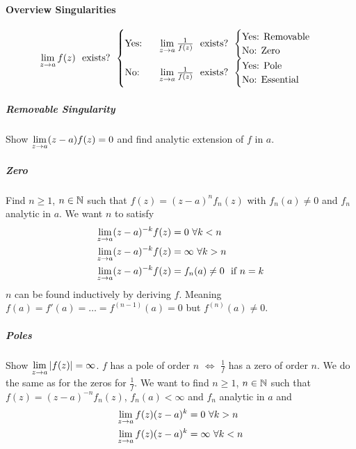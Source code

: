 \paragraph{Overview Singularities}
\begin{align*}
    \limes{z \rightarrow a} f(z) \ \text{ exists? } \begin{cases}
        \text{Yes: } \ &\limes{z \rightarrow a} \frac{1}{f(z)} \ \text{ exists? }
        \begin{cases}
            \text{Yes: Removable}
            \\
            \text{No: Zero}
        \end{cases}
        \\
        \text{No: } \ &\limes{z \rightarrow a} \frac{1}{f(z)} \ \text{ exists? }
        \begin{cases}
            \text{Yes: Pole}
            \\
            \text{No: Essential}
        \end{cases}
    \end{cases}
\end{align*}

\subparagraph{Removable Singularity}
Show $\lim\limits_{z \rightarrow a} (z-a) f(z) = 0$ and find analytic extension of $f$ in $a$.

\subparagraph{Zero}
Find $n \geq 1$, $n \in \mathbb{N}$ such that $f(z) = (z-a)^n f_n (z)$ with $f_n(a) \neq 0$ and
$f_n$ analytic in $a$. We want $n$ to satisfy
\begin{align*}
    \limes{z \rightarrow a} (z-a)^{-k} f(z) &= 0 \ \forall k < n
    \\
    \limes{z \rightarrow a} (z-a)^{-k} f(z) &= \infty \ \forall k > n
    \\
    \limes{z \rightarrow a} (z-a)^{-k} f(z) &= f_n (a) \neq 0 \ \text{ if } n=k
\end{align*}
$n$ can be found inductively by deriving $f$. Meaning
$f(a) = f'(a) = \dots = f^{(n-1)} (a) = 0$ but $f^{(n)} (a) \neq 0$.

\subparagraph{Poles}
Show $\lim\limits_{z \rightarrow a} \left\vert f(z) \right\vert = \infty$. $f$ has a pole of order $n$
$\Leftrightarrow$ $\frac{1}{f}$ has a zero of order $n$. We do the same as for
the zeros for $\frac{1}{f}$. We want to find $n \geq 1$, $n \in \mathbb{N}$ such that
$f(z) = (z-a)^{-n} f_n(z)$, $f_n(a) < \infty$ and $f_n$ analytic in $a$ and
\begin{align*}
    \lim\limits_{z \rightarrow a} f(z) (z-a)^k &= 0 \ \forall k > n
    \\
    \lim\limits_{z \rightarrow a} f(z) (z-a)^k &= \infty \ \forall k < n
\end{align*}

